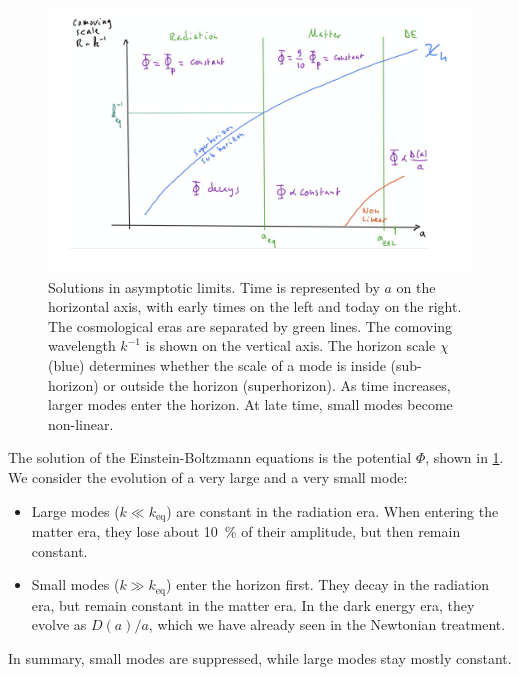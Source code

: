 \begin{figure}
	\centering
	\includegraphics[width=\textwidth]{img/ch-03/asymptotic-behaviour.png}
	\caption{Solutions in asymptotic limits. Time is represented by $a$ on the horizontal axis, with early times on the left and today on the right. The cosmological eras are separated by green lines. The comoving wavelength $k^{-1}$ is shown on the vertical axis. The horizon scale $\chi$ (blue) determines whether the scale of a mode is inside (sub-horizon) or outside the horizon (superhorizon). As time increases, larger modes enter the horizon. At late time, small modes become non-linear.}
	\label{fig:asymptotic-behaviour}
\end{figure}

The solution of the Einstein-Boltzmann equations is the potential $\Phi$, shown in \cref{fig:asymptotic-behaviour}. We consider the evolution of a very large and a very small mode:
\begin{itemize}
	\item Large modes ($k \ll k_\text{eq}$) are constant in the radiation era. When entering the matter era, they lose about \SI{10}{\percent} of their amplitude, but then remain constant.
	\item Small modes ($k\gg k_\text{eq}$) enter the horizon first. They decay in the radiation era, but remain constant in the matter era. In the dark energy era, they evolve as $D(a)/a$, which we have already seen in the Newtonian treatment.
\end{itemize}
In summary, small modes are suppressed, while large modes stay mostly constant.



